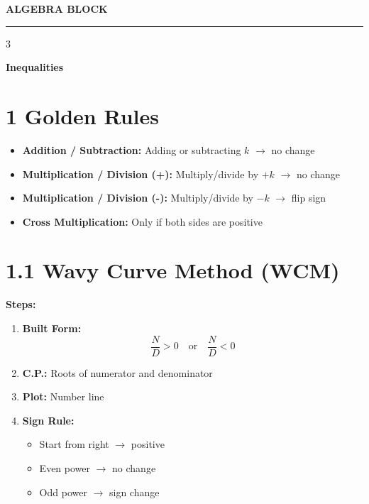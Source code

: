 \documentclass[11pt,a4paper,landscape]{article}
\begin{document}
\begin{center}
\textbf{\Huge \uppercase{Algebra Block}}
\vspace{0.2cm}
\hrule
\end{center}
\vspace{0.3cm}

\begin{multicols*}{3}

\textbf{\Huge Inequalities}

\section*{1 Golden Rules}
\begin{itemize}
\item \textbf{Addition / Subtraction:} Adding or subtracting $k$ $\rightarrow$ no change
\item \textbf{Multiplication / Division (+):} Multiply/divide by $+k$ $\rightarrow$ no change
\item \textbf{Multiplication / Division (-):} Multiply/divide by $-k$ $\rightarrow$ flip sign
\item \textbf{Cross Multiplication:} Only if both sides are positive
\end{itemize}

\section*{1.1 Wavy Curve Method (WCM)}

\textbf{Steps:}
\begin{enumerate}
\item \textbf{Built Form:}
$$
\frac{N}{D} > 0 \quad \text{or} \quad \frac{N}{D} < 0
$$

\item \textbf{C.P.:} Roots of numerator and denominator

\item \textbf{Plot:} Number line

\item \textbf{Sign Rule:}
\begin{itemize}
\item Start from right $\rightarrow$ positive
\item Even power $\rightarrow$ no change
\item Odd power $\rightarrow$ sign change
\end{itemize}


\end{enumerate}
\end{multicols*}
\end{document}
